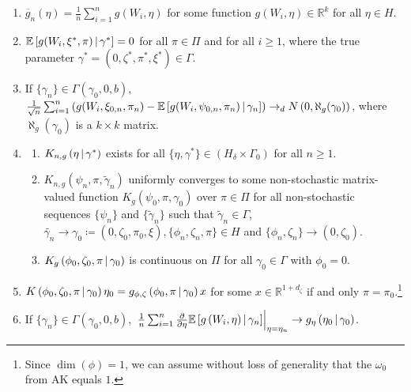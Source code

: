 \documentclass[11pt]{article}
\newcommand*{\R}{\mathbb{R}}
\newcommand*{\E}{\mathbb{E}}
\newcommand*{\N}{N}
\newcommand*{\dto}{\ensuremath{\to_d}}
\newcommand*{\Eta}{H}
\newcommand*{\popmom}{\ensuremath{g}}
\newcommand*{\sampmom}{\ensuremath{\overline{g}_n}}
\newcommand{\mvert}[1][\middle]{\ensuremath{\,#1\vert\,}}
\begin{document}
\begin{enumerate}
    \item $\sampmom(\eta) = \frac{1}{n} \sum_{i=1}^n \popmom(W_i, \eta)$  for some function $\popmom(W_i,
        \eta) \in \R^k$ for all $\eta \in \Eta$.
    \item $\E\left[\popmom(W_i, \xi^{*}, \pi) \mvert \gamma^{*} \right] = 0$ for all $\pi \in \Pi$ and for all $i
        \geq 1$, where the true parameter $\gamma^{*} = (0,\zeta^{*}, \pi^{*}, \xi^{*}) \in \Gamma$.
    \item If $\{ \gamma_n \} \in \Gamma(\gamma_0, 0, b)$, $\frac{1}{\sqrt{n}} \sum_{i=1}^n \left(g(W_i,
        \xi_{0,n}, \pi_n) - \E \left[g(W_i, \psi_{0,n}, \pi_n)\mvert \gamma_n \right]\right)  \dto \N\left(0,
        \aleph_g(\gamma_0)\right)$, where $\aleph_{g}(\gamma_0)$ is a $k \times k$ matrix.
    \item 
        \begin{enumerate}
            \item  $K_{n,g}\left(\eta \mvert \gamma^{*}\right)$ exists for all $\{\eta, \gamma^{*} \} \in
                \left(\Eta_{\delta} \times \Gamma_{0}\right)$ for all $n \geq 1$.
            \item $K_{n,g}(\psi_n, \pi, \tilde{\gamma}_n)$ uniformly converges to some non-stochastic matrix-valued
                function  $K_{g}(\psi_0, \pi, \gamma_0)$  over $\pi \in \Pi$ for all non-stochastic sequences $\{
                \psi_n \}$ and $\{ \tilde{\gamma}_n \}$ such that $\tilde{\gamma}_n \in \Gamma$, $\tilde{\gamma_n}
                \to \gamma_0 \coloneqq (0, \zeta_0, \pi_0, \xi), \{ \phi_n, \zeta_n, \pi \} \in \Eta$ and
                $\{\phi_n, \zeta_n \} \to (0, \zeta_0)$.
                \label{item:asymptotic_valid_cov}
            \item $K_g\left(\phi_0, \zeta_0, \pi \mvert \gamma_0\right)$ is continuous on $\Pi$ for all  $\gamma_0
                \in \Gamma$ with $\phi_0 = 0$.
        \end{enumerate}
        \item $K\left(\phi_0, \zeta_0, \pi \mvert \gamma_0\right) \eta_0 = \popmom_{\phi, \zeta}\left(\phi_0,
            \pi\mvert \gamma_0\right) x$ for some $x \in \R^{1+d_{\zeta}}$ if and only $\pi =
            \pi_0$.\footnote{Since $\dim(\phi) = 1$, we can assume without loss of generality that the $\omega_0$
            from AK equals $1$.}
        \item If $\{ \gamma_n \} \in \Gamma(\gamma_0, 0, b)$, $\left. \frac{1}{n} \sum_{i=1}^n
            \frac{\partial}{\partial \eta}  \E \left[ \popmom\left(W_i, \eta\right ) \mvert \gamma_n \right]
            \right\rvert_{\eta = \eta_n} \to \popmom_{\eta}\left(\eta_0 \mvert \gamma_0\right)$.
\end{enumerate}
\end{document}
